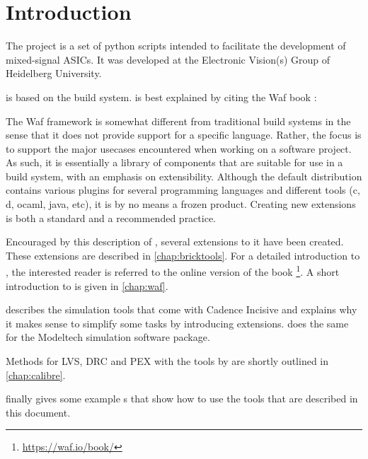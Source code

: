 \chapter{Introduction}

The  project is a set of python scripts intended to facilitate the
development of mixed-signal \Glspl{ASIC}. It was developed at the
Electronic Vision(s) Group of Heidelberg University.

 is based on the  build system.  is best explained by
citing the Waf book \cite{wafbook}:
\begin{displayquote}
	The Waf framework is somewhat different from traditional build systems in
	the sense that it does not provide support for a specific language. Rather,
	the focus is to support the major usecases encountered when working on a
	software project. As such, it is essentially a library of components that
	are suitable for use in a build system, with an emphasis on extensibility.
	Although the default distribution contains various plugins for several
	programming languages and different tools (c, d, ocaml, java, etc), it is
	by no means a frozen product. Creating new extensions is both a standard
	and a recommended practice.
\end{displayquote}

Encouraged by this description of , several extensions to it have been
created. These extensions are described in \cref{chap:bricktools}.
For a detailed introduction to , the interested reader is referred to
the online version of the  book
\cite{wafbook}\footnote{\url{https://waf.io/book/}}. A short introduction to
 is given in \cref{chap:waf}.

 describes the simulation tools that come with Cadence
Incisive and explains why it makes sense to simplify some tasks by introducing
 extensions.  does the same for the Modeltech
simulation software package.

Methods for \gls{LVS}, \gls{DRC} and \gls{PEX} with the  tools by
 are shortly outlined in \cref{chap:calibre}.

 finally gives some example s that show how to use the  tools that are described in this document.

